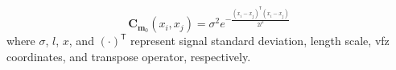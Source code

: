 \begin{equation} 
	\mathbf{C}_{\mathbf{m}_0}\!\left(x_i,x_j\right) = {\sigma}^2 e^{-\frac{\left(x_i-x_j\right)^\mathsf{T}\left(x_i-x_j\right)}{2{l}^2}}
\end{equation}
where $\sigma$, $l$, $x$, and ${\left(\cdot\right)} ^{\mathsf{T}}$ represent signal standard deviation, length scale, \gls{vfz} coordinates, and transpose operator, respectively.